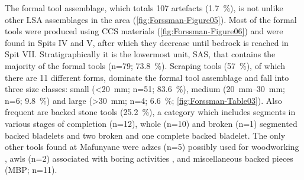 \documentclass{ijsra}
\begin{document}
 The formal tool assemblage, which totals 107  artefacts (\SI{1.7}{\percent}), 
is not unlike other LSA assemblages in the area \parencite{vanDoornum_2005}(\cref{fig:Forssman-Figure05}). 
Most of the formal tools were produced using CCS materials (\cref{fig:Forssman-Figure06})
  and were found in Spits IV and V, after which they decrease until bedrock is reached in Spit VII. Stratigraphically it is the lowermost unit, SAS, that contains the majority of the formal tools (n=79; \SI{73.8}{\percent}). 
  Scraping tools (\SI{57}{\percent}), of which there are 11 different forms,
   dominate the formal tool assemblage and fall into three size classes: 
   small (<\SI{20}{\milli\meter}; n=51; \SI{83.6}{\percent}), 
   medium (\SIrange{20}{30}{\milli\meter}; n=6; \SI{9.8}{\percent}) and large (>\SI{30}{\milli\meter}; n=4; \SI{6.6}{\percent}; 
   \cref{fig:Forssman-Table03}). 
 Also frequent are backed stone tools (\SI{25.2}{\percent}), a category which includes segments in various stages of completion (n=12), 
whole (n=10) and broken (n=1) segmented backed bladelets and two broken and one complete backed bladelet. 
The only other tools found at Mafunyane were adzes (n=5) possibly used for woodworking \parencite{Walker_1994}, awls (n=2) associated with boring activities \parencite{Deacon_1984a}, and miscellaneous backed pieces (MBP; n=11). 
   
\end{document}
